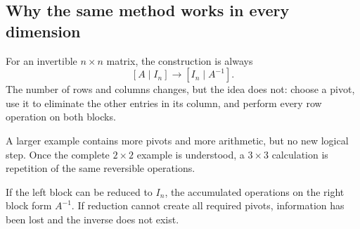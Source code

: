 \subsection{Why the same method works in every dimension}

For an invertible $n\times n$ matrix, the construction is always
\[
[A\mid I_n]\longrightarrow[I_n\mid A^{-1}].
\]
The number of rows and columns changes, but the idea does not: choose a pivot, use it to eliminate the other entries in its column, and perform every row operation on both blocks.

\begin{corebox}
A larger example contains more pivots and more arithmetic, but no new logical step. Once the complete $2\times2$ example is understood, a $3\times3$ calculation is repetition of the same reversible operations.
\end{corebox}

If the left block can be reduced to $I_n$, the accumulated operations on the right block form $A^{-1}$. If reduction cannot create all required pivots, information has been lost and the inverse does not exist.
